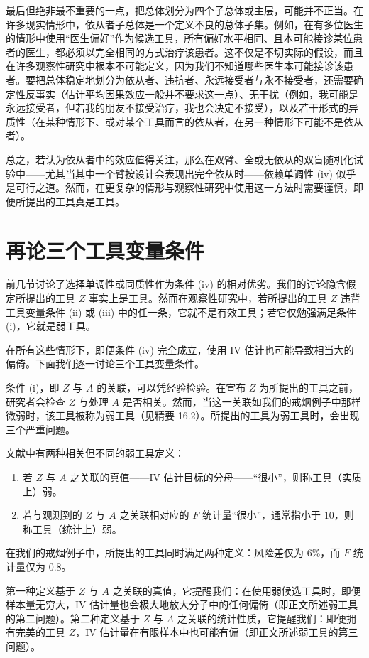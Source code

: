 最后但绝非最不重要的一点，把总体划分为四个子总体或主层，可能并不正当。在许多现实情形中，依从者子总体是一个定义不良的总体子集。例如，在有多位医生的情形中使用“医生偏好”作为候选工具，所有偏好水平相同、且本可能接诊某位患者的医生，都必须以完全相同的方式治疗该患者。这不仅是不切实际的假设，而且在许多观察性研究中根本不可能定义，因为我们不知道哪些医生本可能接诊该患者。要把总体稳定地划分为依从者、违抗者、永远接受者与永不接受者，还需要确定性反事实（估计平均因果效应一般并不要求这一点）、无干扰（例如，我可能是永远接受者，但若我的朋友不接受治疗，我也会决定不接受），以及若干形式的异质性（在某种情形下、或对某个工具而言的依从者，在另一种情形下可能不是依从者）。

总之，若认为依从者中的效应值得关注，那么在双臂、全或无依从的双盲随机化试验中——尤其当其中一个臂按设计会表现出完全依从时——依赖单调性 (iv) 似乎是可行之道。然而，在更复杂的情形与观察性研究中使用这一方法时需要谨慎，即便所提出的工具真是工具。

\section{再论三个工具变量条件}

前几节讨论了选择单调性或同质性作为条件 (iv) 的相对优劣。我们的讨论隐含假定所提出的工具 $Z$ 事实上是工具。然而在观察性研究中，若所提出的工具 $Z$ 违背工具变量条件 (ii) 或 (iii) 中的任一条，它就不是有效工具；若它仅勉强满足条件 (i)，它就是弱工具。

在所有这些情形下，即便条件 (iv) 完全成立，使用 IV 估计也可能导致相当大的偏倚。下面我们逐一讨论三个工具变量条件。

条件 (i)，即 $Z$ 与 $A$ 的关联，可以凭经验检验。在宣布 $Z$ 为所提出的工具之前，研究者会检查 $Z$ 与处理 $A$ 是否相关。然而，当这一关联如我们的戒烟例子中那样微弱时，该工具被称为弱工具（见精要 16.2）。所提出的工具为弱工具时，会出现三个严重问题。

\begin{finepoint}[弱工具变量的定义]
文献中有两种相关但不同的弱工具定义：

\begin{enumerate}[leftmargin=1.9em,itemsep=0.35em,topsep=0.3em]
\item 若 $Z$ 与 $A$ 之关联的真值——IV 估计目标的分母——“很小”，则称工具（实质上）弱。
\item 若与观测到的 $Z$ 与 $A$ 之关联相对应的 $F$ 统计量“很小”，通常指小于 10，则称工具（统计上）弱。
\end{enumerate}

在我们的戒烟例子中，所提出的工具同时满足两种定义：风险差仅为 6\%，而 $F$ 统计量仅为 0.8。

第一种定义基于 $Z$ 与 $A$ 之关联的真值，它提醒我们：在使用弱候选工具时，即便样本量无穷大，IV 估计量也会极大地放大分子中的任何偏倚（即正文所述弱工具的第二问题）。第二种定义基于 $Z$ 与 $A$ 之关联的统计性质，它提醒我们：即便拥有完美的工具 $Z$，IV 估计量在有限样本中也可能有偏（即正文所述弱工具的第三问题）。
\end{finepoint}

